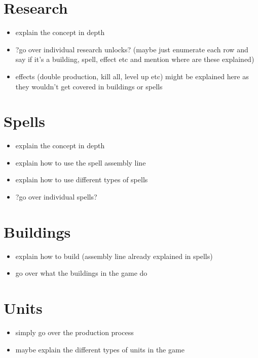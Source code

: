 \section{Research}

\begin{itemize}
    \item explain the concept in depth
    \item ?go over individual research unlocks?
	    (maybe just enumerate each row and say if it's a building, spell, effect etc
	    and mention where are these explained)
    \item effects (double production, kill all, level up etc) might be explained here as they
	    wouldn't get covered in buildings or spells
\end{itemize}

\section{Spells}

\begin{itemize}
    \item explain the concept in depth
    \item explain how to use the spell assembly line
    \item explain how to use different types of spells
    \item ?go over individual spells?
\end{itemize}

\section{Buildings}

\begin{itemize}
    \item explain how to build (assembly line already explained in spells)
    \item go over what the buildings in the game do
\end{itemize}

\section{Units}

\begin{itemize}
    \item simply go over the production process
    \item maybe explain the different types of units in the game
\end{itemize}
